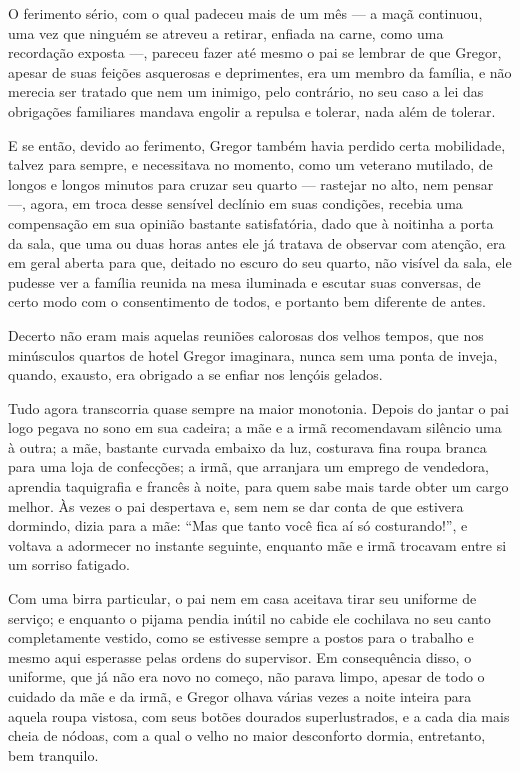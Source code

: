 \noindent{}O ferimento sério, com o qual padeceu mais de um mês --- a maçã continuou,
uma vez que ninguém se atreveu a retirar, enfiada na carne, como uma
recordação exposta ---, pareceu fazer até mesmo o pai se lembrar de que
Gregor, apesar de suas feições asquerosas e deprimentes, era um membro da
família, e não merecia ser tratado que nem um inimigo, pelo contrário, no
seu caso a lei das obrigações familiares mandava engolir a repulsa e
tolerar, nada além de tolerar.

E se então, devido ao ferimento, Gregor também havia perdido certa
mobilidade, talvez para sempre, e necessitava no momento, como um veterano
mutilado, de longos e longos minutos para cruzar seu quarto --- rastejar no
alto, nem pensar ---, agora, em troca desse sensível declínio em suas
condições, recebia uma compensação em sua opinião bastante satisfatória,
dado que à noitinha a porta da sala, que uma ou duas horas antes ele já
tratava de observar com atenção, era em geral aberta para que, deitado no
escuro do seu quarto, não visível da sala, ele pudesse ver a família
reunida na mesa iluminada e escutar suas conversas, de certo modo com o
consentimento de todos, e portanto bem diferente de antes.

Decerto não eram mais aquelas reuniões calorosas dos velhos tempos, que
nos minúsculos quartos de hotel Gregor imaginara, nunca sem uma ponta de
inveja, quando, exausto, era obrigado a se enfiar nos lençóis gelados.

Tudo agora transcorria quase sempre na maior monotonia. Depois do jantar o
pai logo pegava no sono em sua cadeira; a mãe e a irmã recomendavam
silêncio uma à outra; a mãe, bastante curvada embaixo da luz, costurava
fina roupa branca para uma loja de confecções; a irmã, que arranjara um
emprego de vendedora, aprendia taquigrafia e francês à noite, para quem
sabe mais tarde obter um cargo melhor. Às vezes o pai despertava e, sem
nem se dar conta de que estivera dormindo, dizia para a mãe: “Mas que
tanto você fica aí só costurando!”, e voltava a adormecer no instante
seguinte, enquanto mãe e irmã trocavam entre si um sorriso fatigado.

Com uma birra particular, o pai nem em casa aceitava tirar seu uniforme de
serviço; e enquanto o pijama pendia inútil no cabide ele cochilava no seu
canto completamente vestido, como se estivesse sempre a postos para o
trabalho e mesmo aqui esperasse pelas ordens do supervisor. Em
consequência disso, o uniforme, que já não era novo no começo, não parava
limpo, apesar de todo o cuidado da mãe e da irmã, e Gregor olhava várias
vezes a noite inteira para aquela roupa vistosa, com seus botões dourados
superlustrados, e a cada dia mais cheia de nódoas, com a qual o velho no
maior desconforto dormia, entretanto, bem tranquilo.

